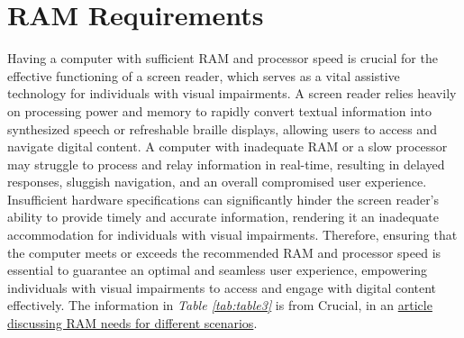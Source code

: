 \pagebreak \hypertarget{ram-requirements}{}\section{RAM Requirements}\label{ram-requirements}
Having a computer with sufficient RAM and processor speed is crucial for the effective functioning of a screen reader, which serves as a vital assistive technology for individuals with visual impairments. A screen reader relies heavily on processing power and memory to rapidly convert textual information into synthesized speech or refreshable braille displays, allowing users to access and navigate digital content. A computer with inadequate RAM or a slow processor may struggle to process and relay information in real-time, resulting in delayed responses, sluggish navigation, and an overall compromised user experience. Insufficient hardware specifications can significantly hinder the screen reader's ability to provide timely and accurate information, rendering it an inadequate accommodation for individuals with visual impairments. Therefore, ensuring that the computer meets or exceeds the recommended RAM and processor speed is essential to guarantee an optimal and seamless user experience, empowering individuals with visual impairments to access and engage with digital content effectively.
The information in \textit{Table \ref{tab:table3}} is from Crucial, in an \href{http://www.crucial.com/articles/about-memory/how-much-ram-does-my-computer-need}{article discussing RAM needs for different scenarios}.

